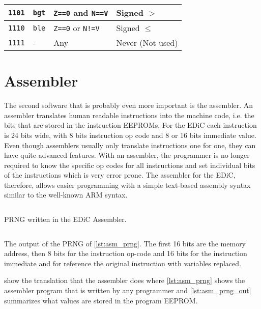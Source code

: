\begin{table}
\begin{tabularx}{\textwidth}{ |c|l|l|X| }
    \texttt{1101}           & \texttt{bgt}                         & \texttt{Z==0} and \texttt{N==V} & Signed $>$       \\\hline
    \texttt{1110}           & \texttt{ble}                         & \texttt{Z==0} or \texttt{N!=V}  & Signed $\leq$    \\\hline
    \texttt{1111}           & -                                    & Any                             & Never (Not used) \\\hline
  \end{tabularx}
\end{table}

\section{Assembler}
The second software that is probably even more important is the assembler.
An assembler translates human readable instructions into the machine code, i.e. the bits that are stored in the instruction \glspl{EEPROM}.
For the \gls{EDiC} each instruction is 24 bits wide, with 8 bits instruction op code and 8 or 16 bits immediate value.
Even though assemblers usually only translate instructions one for one, they can have quite advanced features.
With an assembler, the programmer is no longer required to know the specific op codes for all instructions and set individual bits of the instructions which is very error prone.
The assembler for the \gls{EDiC}, therefore, allows easier programming with a simple text-based assembly syntax similar to the well-known ARM syntax.
\begin{listing}
  \inputminted[linenos,
    breaklines,
    frame=leftline,
    xleftmargin=20pt,
  ]{ARM}{src/prng.s}
  \caption{\gls{PRNG} written in the \gls{EDiC} Assembler.}
  \label{lst:asm_prng}
\end{listing}

\begin{listing}
  \inputminted[linenos,
    breaklines,
    frame=leftline,
    xleftmargin=20pt,
  ]{ARM}{src/prng_out.s}
  \caption{The output of the \gls{PRNG} of \cref{lst:asm_prng}. The first 16 bits are the memory address, then 8 bits for the instruction op-code and 16 bits for the instruction immediate and for reference the original instruction with variables replaced.}
  \label{lst:asm_prng_out}
\end{listing}

 show the translation that the assembler does where \cref{lst:asm_prng} shows the assembler program that is written by any programmer and \cref{lst:asm_prng_out} summarizes what values are stored in the program \gls{EEPROM}.

